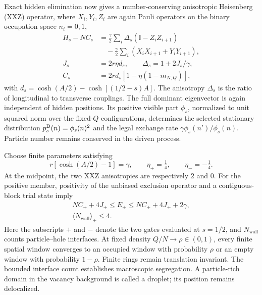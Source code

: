 \documentclass[aps,pre,reprint,amsmath,amssymb,longbibliography,floatfix]{revtex4-2}
\newcommand{\Id}{\mathbb I}
\begin{document}
Exact hidden elimination now gives a number-conserving anisotropic
Heisenberg (XXZ) operator,
where $X_i,Y_i,Z_i$ are again Pauli operators on the binary occupation
space $n_i=0,1$,
\begin{align}
 H_s-NC_s
 &=\frac\gamma2\sum_i\Delta_s(\Id-Z_iZ_{i+1})\nonumber\\
 &\quad-\frac\gamma2\sum_i(X_iX_{i+1}+Y_iY_{i+1}),\nonumber\\
 J_s&=2r\eta d_s,\qquad \Delta_s=1+2J_s/\gamma,\nonumber\\
 C_s&=2rd_s\left[1-\eta(1-m_{N,Q})\right],
 \label{eq:conserved-XXZ}
\end{align}
with $d_s=\cosh(A/2)-\cosh\left[(1/2-s)A\right]$. The anisotropy $\Delta_s$ is the ratio of longitudinal to transverse
couplings. The full dominant eigenvector
is again independent of hidden positions. Its positive visible part $\phi_s$, normalized to unit squared norm
over the fixed-$Q$ configurations, determines the selected stationary distribution
$p_s^{\rm D}(n)=\phi_s(n)^2$ and the legal exchange rate
$\gamma\phi_s(n')/\phi_s(n)$. Particle number
remains conserved in the driven process.

Choose finite parameters satisfying
\begin{equation}
 r\left[\cosh(A/2)-1\right]=\gamma,\qquad \eta_+=\tfrac14,
 \qquad\eta_-=-\tfrac14.
 \label{eq:conserved-pair}
\end{equation}
At the midpoint, the two XXZ anisotropies are respectively $2$ and $0$.
For the positive member, positivity of the unbiased exclusion operator
and a contiguous-block trial state imply
\begin{equation}
 \begin{gathered}
 NC_++4J_+\leq E_+\leq NC_++4J_++2\gamma,
 \\\langle N_{\mathrm{wall}}\rangle_+\leq4.
 \end{gathered}
 \label{eq:conserved-wall-main}
\end{equation}
Here the subscripts $+$ and $-$ denote the two gates evaluated at
$s=1/2$, and $N_{\mathrm{wall}}$ counts particle--hole interfaces. At fixed
density $Q/N\to\rho\in(0,1)$, every finite spatial window converges
to an occupied window with probability $\rho$ or an empty window with
probability $1-\rho$. Finite rings remain translation invariant. The bounded interface count establishes macroscopic segregation.
A particle-rich domain in the vacancy background is called a droplet;
its  position remains delocalized.
\end{document}

